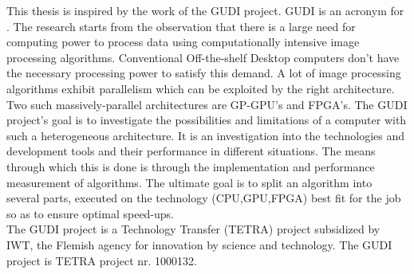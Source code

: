 This thesis is inspired by the work of the GUDI project. GUDI is an acronym for . The research starts from the observation that there is a large need for computing power to process data using computationally intensive image processing algorithms. Conventional Off-the-shelf Desktop computers don't have the necessary processing power to satisfy this demand. A lot of image processing algorithms exhibit parallelism which can be exploited by the right architecture. Two such massively-parallel architectures are GP-GPU's and FPGA's. The GUDI project's goal is to investigate the possibilities and limitations of a computer with such a heterogeneous architecture. It is an investigation into the technologies and development tools and their performance in different situations. The means through which this is done is through the implementation and performance measurement of algorithms. The ultimate goal is to split an algorithm into several parts, executed on the technology (CPU,GPU,FPGA) best fit for the job so as to ensure optimal speed-ups.\\
The GUDI project is a Technology Transfer (TETRA) project subsidized by IWT, the Flemish agency for innovation by science and technology. The GUDI project is TETRA project nr. 1000132\cite{gudisite}.






